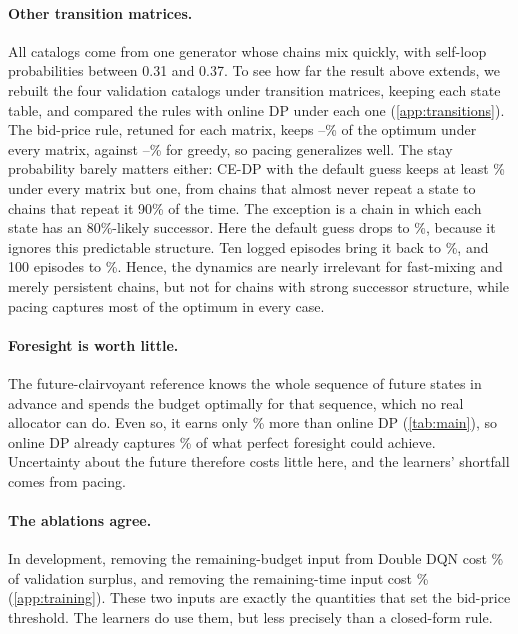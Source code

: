 \documentclass[10pt]{article}
\begin{document}
\paragraph{Other transition matrices.} All catalogs come from one generator whose chains mix quickly, with self-loop probabilities between 0.31 and 0.37. To see how far the result above extends, we rebuilt the four validation catalogs under \trVariants{} transition matrices, keeping each state table, and compared the rules with online DP under each one (\cref{app:transitions}). The bid-price rule, retuned for each matrix, keeps \trBpMin--\trBpMax\% of the optimum under every matrix, against \trGreedyMin--\trGreedyMax\% for greedy, so pacing generalizes well. The stay probability barely matters either: CE-DP with the default guess keeps at least \trCeOkMin\% under every matrix but one, from chains that almost never repeat a state to chains that repeat it 90\% of the time. The exception is a chain in which each state has an 80\%-likely successor. Here the default guess drops to \trCeSucc\%, because it ignores this predictable structure. Ten logged episodes bring it back to \trCeSuccKten\%, and 100 episodes to \trCeSuccKhundred\%. Hence, the dynamics are nearly irrelevant for fast-mixing and merely persistent chains, but not for chains with strong successor structure, while pacing captures most of the optimum in every case.

\paragraph{Foresight is worth little.} The future-clairvoyant reference knows the whole sequence of future states in advance and spends the budget optimally for that sequence, which no real allocator can do. Even so, it earns only \cfForesight\% more than online DP (\cref{tab:main}), so online DP already captures \cfOnlineOfFuture\% of what perfect foresight could achieve. Uncertainty about the future therefore costs little here, and the learners' shortfall comes from pacing.

\paragraph{The ablations agree.} In development, removing the remaining-budget input from Double DQN cost \ablDropNoBudget\% of validation surplus, and removing the remaining-time input cost \ablDropNoHorizon\% (\cref{app:training}). These two inputs are exactly the quantities that set the bid-price threshold. The learners do use them, but less precisely than a closed-form rule.
\end{document}

